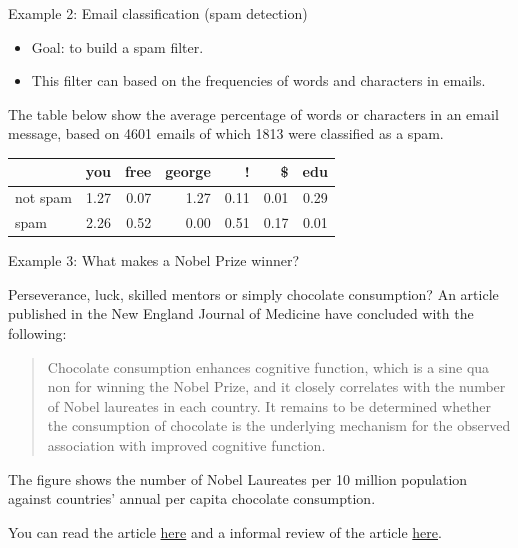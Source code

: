 \documentclass[ignorenonframetext,]{beamer}
\providecommand{\tightlist}{%
  \setlength{\itemsep}{0pt}\setlength{\parskip}{0pt}}
\begin{document}
\begin{frame}

\begin{block}{Example 2: Email classification (spam detection)}

\begin{itemize}
\tightlist
\item
  Goal: to build a spam filter.
\item
  This filter can based on the frequencies of words and characters in
  emails.
\end{itemize}

The table below show the average percentage of words or characters in an
email message, based on 4601 emails of which 1813 were classified as a
spam.

\begin{longtable}[]{@{}lrrrrrr@{}}
\toprule
& you & free & george & ! & \$ & edu\tabularnewline
\midrule
\endhead
not spam & 1.27 & 0.07 & 1.27 & 0.11 & 0.01 & 0.29\tabularnewline
spam & 2.26 & 0.52 & 0.00 & 0.51 & 0.17 & 0.01\tabularnewline
\bottomrule
\end{longtable}

\end{block}

\end{frame}

\begin{frame}

\begin{block}{Example 3: What makes a Nobel Prize winner?}

Perseverance, luck, skilled mentors or simply chocolate consumption? An
article published in the New England Journal of Medicine have concluded
with the following:

\begin{quote}
Chocolate consumption enhances cognitive function, which is a sine qua
non for winning the Nobel Prize, and it closely correlates with the
number of Nobel laureates in each country. It remains to be determined
whether the consumption of chocolate is the underlying mechanism for the
observed association with improved cognitive function.
\end{quote}

The figure shows the number of Nobel Laureates per 10 million population
against countries' annual per capita chocolate consumption.

You can read the article
\href{http://www.nejm.org/doi/full/10.1056/NEJMon1211064}{here} and a
informal review of the article
\href{https://blogs.scientificamerican.com/the-curious-wavefunction/chocolate-consumption-and-nobel-prizes-a-bizarre-juxtaposition-if-there-ever-was-one/}{here}.

\end{block}

\end{frame}
\end{document}
